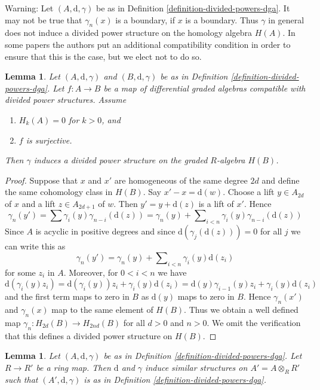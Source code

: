 \documentclass{stacks-project}
\theoremstyle{plain}
\newtheorem{lemma}[subsection]{Lemma}
\theoremstyle{definition}
\theoremstyle{remark}
\numberwithin{equation}{subsection}
\begin{document}
\noindent
Warning: Let $(A, \text{d}, \gamma)$ be as in
Definition \ref{definition-divided-powers-dga}.
It may not be true that $\gamma_n(x)$ is a boundary, if
$x$ is a boundary. Thus $\gamma$ in general does not induce
a divided power structure on the homology algebra $H(A)$.
In some papers the authors put an additional compatibility
condition in order to ensure that this is the case, but we elect
not to do so.

\begin{lemma}
\label{lemma-dpdga-good}
Let $(A, \text{d}, \gamma)$ and $(B, \text{d}, \gamma)$ be as in
Definition \ref{definition-divided-powers-dga}. Let $f : A \to B$
be a map of differential graded algebras compatible with divided
power structures. Assume
\begin{enumerate}
\item $H_k(A) = 0$ for $k > 0$, and
\item $f$ is surjective.
\end{enumerate}
Then $\gamma$ induces a divided power structure on the graded
$R$-algebra $H(B)$.
\end{lemma}

\begin{proof}
Suppose that $x$ and $x'$ are homogeneous of the same degree $2d$
and define the same cohomology class in $H(B)$. Say $x' - x = \text{d}(w)$.
Choose a lift $y \in A_{2d}$ of $x$ and a lift $z \in A_{2d + 1}$
of $w$. Then $y' = y + \text{d}(z)$ is a lift of $x'$.
Hence
$$
\gamma_n(y') = \sum \gamma_i(y) \gamma_{n - i}(\text{d}(z))
= \gamma_n(y) +
\sum\nolimits_{i < n} \gamma_i(y) \gamma_{n - i}(\text{d}(z))
$$
Since $A$ is acyclic in positive degrees and since
$\text{d}(\gamma_j(\text{d}(z))) = 0$ for all $j$ we can write
this as
$$
\gamma_n(y') = \gamma_n(y) +
\sum\nolimits_{i < n} \gamma_i(y) \text{d}(z_i)
$$
for some $z_i$ in $A$. Moreover, for $0 < i < n$ we have
$$
\text{d}(\gamma_i(y) z_i) =
\text{d}(\gamma_i(y))z_i + \gamma_i(y)\text{d}(z_i) =
\text{d}(y) \gamma_{i - 1}(y) z_i + \gamma_i(y)\text{d}(z_i)
$$
and the first term maps to zero in $B$ as $\text{d}(y)$ maps to zero in $B$.
Hence $\gamma_n(x')$ and $\gamma_n(x)$ map to the same element of $H(B)$.
Thus we obtain a well defined map $\gamma_n : H_{2d}(B) \to H_{2nd}(B)$
for all $d > 0$ and $n > 0$. We omit the verification that this
defines a divided power structure on $H(B)$.
\end{proof}

\begin{lemma}
\label{lemma-base-change-div}
Let $(A, \text{d}, \gamma)$ be as in
Definition \ref{definition-divided-powers-dga}.
Let $R \to R'$ be a ring map.
Then $\text{d}$ and $\gamma$ induce similar structures on
$A' = A \otimes_R R'$ such that $(A', \text{d}, \gamma)$ is as in
Definition \ref{definition-divided-powers-dga}.
\end{lemma}
\end{document}
